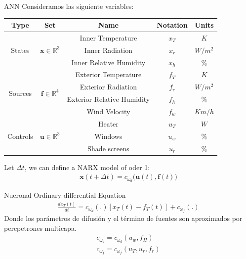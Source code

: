     \begin{model}{ANN}{}
        Consideramos las siguiente variables:
        \begin{center}
            \begin{tabular}{|c|c|c|c|c|}
                \hline
                \textbf{Type} & \textbf{Set} &\textbf{Name} & \textbf{Notation} & \textbf{Units} \\
                    \hline
                    \multirow{3}{*}{States} & 
                    \multirow{3}{*}{$\bm{x} \in \mathbb{R}^3$}&
                        Inner Temperature & $x_{T}$ & $K$ \\
                    & & Inner Radiation & $x_{r}$ & $W/m^2$ \\
                    & & Inner Relative Humidity & $x_{h}$ & $\%$\\
                    \hline
                    \hline
                    \multirow{4}{*}{Sources } &
                    \multirow{4}{*}{$\bm{f} \in \mathbb{R}^4$} &
                        Exterior Temperature & $f_{T}$ & $K$ \\
                    & & Exterior Radiation & $f_{r}$ & $W/m^2$ \\
                    & & Exterior Relative Humidity & $f_{h}$ & $\%$\\
                    & & Wind Velocity & $f_w$ & $Km/h$  \\
                    \hline
                    \hline
                    \multirow{3}{*}{Controls} &
                    \multirow{3}{*}{$\bm{u} \in \mathbb{R}^3$} &
                        Heater         & $u_{T}$ & $W$ \\
                    & & Windows        & $u_{w}$ & $\%$ \\
                    & & Shade screens  & $u_{r}$ & $\%$\\
                        \hline
            \end{tabular}  
        \end{center}
        
        Let $\Delta t$, we can define a NARX model of oder 1:
        \begin{gather}
            \bm{x}(t+\Delta t) = c_{\omega_d} \big(\bm{u}(t),\bm{f}(t) \big)
        \end{gather}
        
        \end{model}
    
        \begin{model}{Nueronal Ordinary differential Equation}{}
            \begin{gather}
                \frac{dx_{T}(t)}{dt} = c_{\omega_d}(.)[x_{T}(t) - f_{T}(t)] + c_{\omega_f}(.) 
            \end{gather}
            Donde los parámetros de difusión y el término de fuentes son aproximados por percpetrones multicapa.
            \begin{gather}
                c_{\omega_d} = c_{\omega_d}(u_w,f_H) \\
                c_{\omega_f} =  c_{\omega_f}(u_T,u_r,f_r)
            \end{gather}
            \end{model}
            
